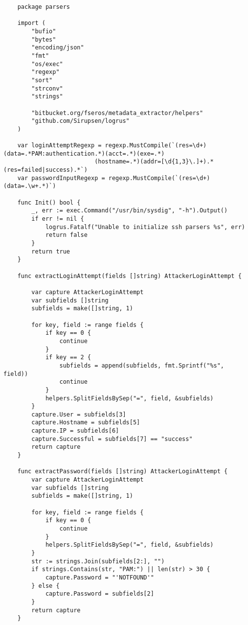 \begin{verbatim}
    package parsers
    
    import (
        "bufio"
        "bytes"
        "encoding/json"
        "fmt"
        "os/exec"
        "regexp"
        "sort"
        "strconv"
        "strings"
    
        "bitbucket.org/fseros/metadata_extractor/helpers"
        "github.com/Sirupsen/logrus"
    )
    
    var loginAttemptRegexp = regexp.MustCompile(`(res=\d+) (data=.*PAM:authentication.*)(acct=.*)(exe=.*)
                          (hostname=.*)(addr=[\d{1,3}\.]+).*(res=failed|success).*`)
    var passwordInputRegexp = regexp.MustCompile(`(res=\d+) (data=.\w+.*)`)
    
    func Init() bool {
        _, err := exec.Command("/usr/bin/sysdig", "-h").Output()
        if err != nil {
            logrus.Fatalf("Unable to initialize ssh parsers %s", err)
            return false
        }
        return true
    }
    
    func extractLoginAttempt(fields []string) AttackerLoginAttempt {
    
        var capture AttackerLoginAttempt
        var subfields []string
        subfields = make([]string, 1)
    
        for key, field := range fields {
            if key == 0 {
                continue
            }
            if key == 2 {
                subfields = append(subfields, fmt.Sprintf("%s", field))
                continue
            }
            helpers.SplitFieldsBySep("=", field, &subfields)
        }
        capture.User = subfields[3]
        capture.Hostname = subfields[5]
        capture.IP = subfields[6]
        capture.Successful = subfields[7] == "success"
        return capture
    }
    
    func extractPassword(fields []string) AttackerLoginAttempt {
        var capture AttackerLoginAttempt
        var subfields []string
        subfields = make([]string, 1)
    
        for key, field := range fields {
            if key == 0 {
                continue
            }
            helpers.SplitFieldsBySep("=", field, &subfields)
        }
        str := strings.Join(subfields[2:], "")
        if strings.Contains(str, "PAM:") || len(str) > 30 {
            capture.Password = "'NOTFOUND'"
        } else {
            capture.Password = subfields[2]
        }
        return capture
    }
    

\end{verbatim}

